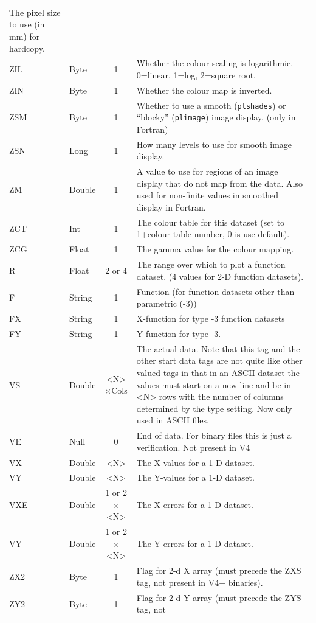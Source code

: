 \documentclass[english]{article}
\begin{document}
\begin{longtable}{|llcp{8cm}|}
  The pixel size to use (in mm) for hardcopy.\\
  ZIL & Byte & 1 & Whether the colour scaling is
  logarithmic. 0=linear, 1=log, 2=square root.\\
  ZIN & Byte & 1 & Whether the colour map is inverted.\\
  ZSM & Byte & 1 & Whether to use a smooth (\texttt{plshades}) or
  ``blocky'' (\texttt{plimage}) image display. (only in Fortran)\\
  ZSN & Long & 1 & How many levels to use for smooth image display.\\
  ZM & Double & 1 & A value to use for regions of an image display that
  do not map from the data. Also used for non-finite values in smoothed
  display in Fortran.\\
  ZCT & Int & 1 & The colour table for this dataset (set to 1+colour
  table number, 0 is use default).\\
  ZCG & Float & 1 & The gamma value for the colour mapping.\\
  R& Float& 2 or 4& The range over which to plot a function dataset. (4
  values for 2-D
  function datasets).\\
  F& String& 1&
  Function (for function datasets other than parametric (-3))\\
  FX& String& 1&
  X-function for type -3 function datasets\\
  FY& String& 1&
  Y-function for type -3.\\
  VS& Double& <N>$\times$Cols& The actual data. Note that this tag and
  the other start data tags are not quite like other valued tags in that
  in an ASCII dataset the values must start on a new line and be in <N>
  rows with the number of columns
  determined by the type setting. Now only used in ASCII files.\\
  VE& Null& 0&
  End of data. For binary files this is just a verification. Not
  present in V4\\
  VX & Double & <N> & The X-values for a 1-D dataset.\\
  VY & Double & <N> & The Y-values for a 1-D dataset.\\
  VXE & Double & 1 or 2 $\times$ <N> & The X-errors for a 1-D dataset.\\
  VY & Double & 1 or 2 $\times$ <N> & The Y-errors for a 1-D dataset.\\
  ZX2 & Byte & 1 & Flag for 2-d X array (must precede the ZXS tag, not
  present in V4+ binaries).\\
  ZY2 & Byte & 1 & Flag for 2-d Y array (must precede the ZYS tag, not

\end{longtable}
\end{document}
